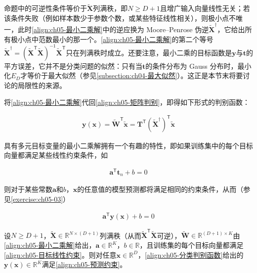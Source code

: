 \documentclass[../../main.tex]{subfiles}
\begin{document}
\begin{remark}
命题中的可逆性条件等价于$\tilde{\boldsymbol{X}}$列满秩，即$N\geqslant D+1$且增广输入向量线性无关；若该条件失败（例如样本数少于参数个数，或某些特征线性相关），则极小点不唯一，此时\eqref{align:ch05-最小二乘解}中的逆应换为 Moore--Penrose 伪逆$\tilde{\boldsymbol{X}}^{\dagger}$，它给出所有极小点中范数最小的那一个。\eqref{align:ch05-最小二乘解}的第二个等号$\tilde{\boldsymbol{X}}^{\dagger}=(\tilde{\boldsymbol{X}}^{\mathsf{T}}\tilde{\boldsymbol{X}})^{-1}\tilde{\boldsymbol{X}}^{\mathsf{T}}$只在列满秩时成立。还要注意，最小二乘的目标函数是$\boldsymbol{y}$与$\boldsymbol{t}$的平方误差，它并不是分类问题的似然：只有当$\boldsymbol{t}$的条件分布为 Gauss 分布时，最小化$E_D$才等价于最大似然（参见\cref{subsection:ch04-最大似然}）。这正是本节末将要讨论的局限性的来源。
\end{remark}

将\eqref{align:ch05-最小二乘解}代回\eqref{align:ch05-矩阵判别}，即得如下形式的判别函数：

\begin{align}
  \boldsymbol{y}(\boldsymbol{x})=\tilde{\boldsymbol{W}}^{\mathsf{T}}\tilde{\boldsymbol{x}}=\boldsymbol{T}^{\mathsf{T}}(\tilde{\boldsymbol{X}}^{\dagger})^{\mathsf{T}}\tilde{\boldsymbol{x}}
  \label{align:ch05-分类判别函数}
\end{align}

具有多元目标变量的最小二乘解拥有一个有趣的特性，即如果训练集中的每个目标向量都满足某些线性约束条件，如

\begin{align}
  \boldsymbol{a}^{\mathsf{T}}\boldsymbol{t}_n+b=0
  \label{align:ch05-目标线性约束}
\end{align}

则对于某些常数$\boldsymbol{a}$和$b$，$\boldsymbol{x}$的任意值的模型预测都将满足相同的约束条件，从而（参见\cref{exercise:ch05-03}）

\begin{align}
  \boldsymbol{a}^{\mathsf{T}}\boldsymbol{y}(\boldsymbol{x})+b=0
  \label{align:ch05-预测约束}
\end{align}

\begin{proposition}[最小二乘预测保持目标向量的线性约束]\label{proposition:ch05-预测保持约束}
设$N\geqslant D+1$，$\tilde{\boldsymbol{X}}\in\mathbb{R}^{N\times(D+1)}$列满秩（从而$\tilde{\boldsymbol{X}}^{\mathsf{T}}\tilde{\boldsymbol{X}}$可逆），$\tilde{\boldsymbol{W}}\in\mathbb{R}^{(D+1)\times K}$由\eqref{align:ch05-最小二乘解}给出，$\boldsymbol{a}\in\mathbb{R}^{K}$，$b\in\mathbb{R}$，且训练集的每个目标向量都满足\eqref{align:ch05-目标线性约束}。则对任意$\boldsymbol{x}\in\mathbb{R}^{D}$，\eqref{align:ch05-分类判别函数}给出的$\boldsymbol{y}(\boldsymbol{x})\in\mathbb{R}^{K}$满足\eqref{align:ch05-预测约束}。
\end{proposition}
\end{document}
